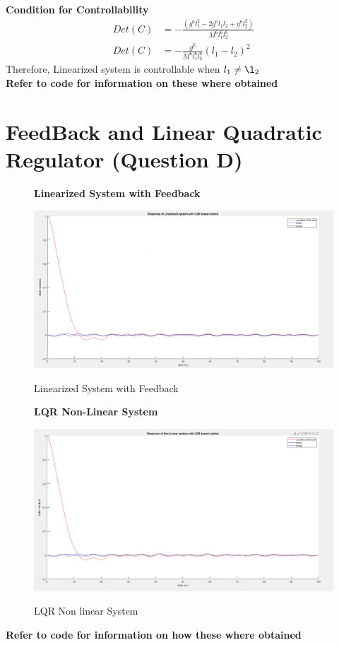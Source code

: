 \documentclass[12pt]{article}
\begin{document}
\textbf{Condition for Controllability}
\begin{align}
  Det(C) &= -\frac{(g^6l_1^2-2g^6l_1l_2+g^6l_2^2)}{M^6l_1^6l_2^6} \\
  Det(C) &= -\frac{g^6}{M^6l_1^6l_2^6}(l_1-l_2)^2
\end{align}
Therefore, Linearized system is controllable when $l_1 \neq \l_2$ \\
\textbf{Refer to code for information on these where obtained}

\section{FeedBack and Linear Quadratic Regulator (Question D)}
\begin{figure}[H]
    \centering
    \textbf{ Linearized System with Feedback }\par\medskip
    \includegraphics[scale = 0.3]{lqrlinearized.png}\\[0.0 cm]	%
    \caption{Linearized System with Feedback} 
\end{figure}

\begin{figure}[H]
    \centering
    \textbf{ LQR Non-Linear System}\par\medskip
    \includegraphics[scale = 0.3]{lqrNonlinearized.png}\\[0.0 cm]	%
    \caption{LQR Non linear System} 
\end{figure}
\textbf{Refer to code for information on how these where obtained}
\end{document}
